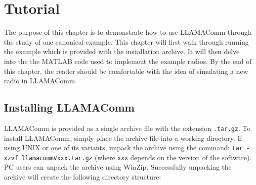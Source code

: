 %
%
%
%
%
\chapter{Tutorial} \label{chp:tutorial}

The purpose of this chapter is to demonstrate how to use LLAMAComm
through the study of one canonical example.  This chapter will first
walk through running the example which is provided with the
installation archive.  It will then delve into the the MATLAB code
used to implement the example radios.  By the end of this chapter,
the reader should be comfortable with the idea of simulating a new
radio in LLAMAComm.

\section{Installing LLAMAComm}

LLAMAComm is provided as a single archive file with the extension
\verb+.tar.gz+.  To install LLAMAComm, simply place the archive file
into a working directory.  If using UNIX or one of its variants,
unpack the archive using the command: \verb+tar -xzvf llamacommVxxx.tar.gz+
(where \verb+xxx+ depends on the version of
the software).  PC users can unpack the archive using WinZip.
Successfully unpacking the archive will create the following
directory structure:

